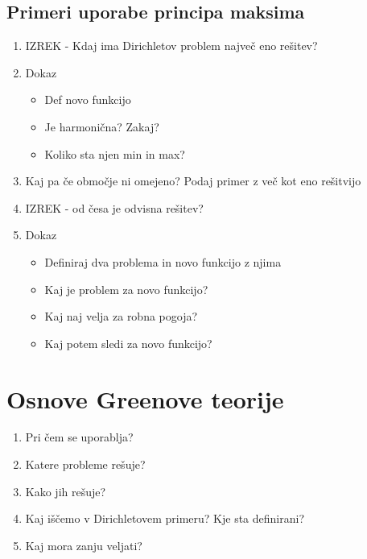 \documentclass{article}
\begin{document}
    \subsection{Primeri uporabe principa maksima}
    \begin{enumerate}
        \item IZREK - Kdaj ima Dirichletov problem največ eno rešitev?
        \item Dokaz
        \begin{itemize}
            \item Def novo funkcijo
            \item Je harmonična? Zakaj?
            \item Koliko sta njen min in max?
        \end{itemize}
        \item Kaj pa če območje ni omejeno? Podaj primer z več kot eno rešitvijo
        \item IZREK - od česa je odvisna rešitev?
        \item Dokaz
        \begin{itemize}
            \item Definiraj dva problema in novo funkcijo z njima
            \item Kaj je problem za novo funkcijo?
            \item Kaj naj velja za robna pogoja?
            \item Kaj potem sledi za novo funkcijo?
        \end{itemize}
    \end{enumerate}

    \section{Osnove Greenove teorije}
    \begin{enumerate}
        \item Pri čem se uporablja?
        \item Katere probleme rešuje?
        \item Kako jih rešuje?
        \item Kaj iščemo v Dirichletovem primeru? Kje sta definirani?
        \item Kaj mora zanju veljati?
    \end{enumerate}
\end{document}
